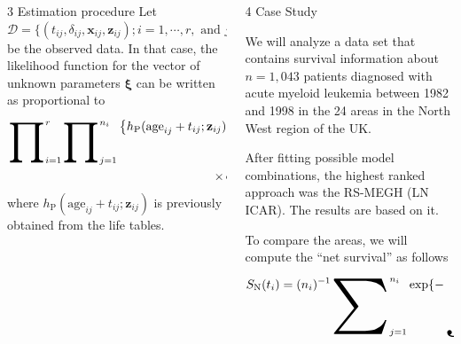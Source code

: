 \documentclass[12pt]{beamer}
\begin{document}
\begin{frame}[t]
\begin{columns}[t]
\begin{column}{0.30\textwidth}
\begin{block}{\Large 3 Estimation procedure}
			Let $\mathcal{D} = \{(t_{ij}, \delta_{ij}, \mathbf{x}_{ij}, \mathbf{z}_{ij}); i = 1, \cdots, r, \text{ and } j = 1, \cdots, n_i\}$ be the observed data. In that case, the likelihood function for the vector of unknown parameters $\boldsymbol{\xi}$ can be written as proportional to
			\begin{align*}
				\displaystyle\raisebox{-18pt}{\scalebox{3.2}{\ensuremath{\prod}}}_{i = 1}^{r}\displaystyle\raisebox{-18pt}{\scalebox{3.2}{\ensuremath{\prod}}}_{j = 1}^{n_i} \left\{h_{\text{P}}(\text{age}_{ij} + t_{ij}; \mathbf{z}_{ij}) + h_{\text{E}}(t_{ij}; \mathbf{x}_{ij}, \tilde{u}_i, u_i)\right\}^{\delta_{ij}} \times \\ 
				\times \exp\{-H_{\text{E}}(t_{ij}; \textbf{x}_{ij}, \tilde{u}_i, u_i)\},
			\end{align*}
			where $h_{\text{P}}(\text{age}_{ij} + t_{ij}; \mathbf{z}_{ij})$ is previously obtained from the life tables. 
				
				\vspace{18pt}
				
			\end{block}
			
			\vspace{18pt}
			
			\end{column}
		
			\begin{column}{0.30\textwidth} \justifying %
		
			\begin{block}{\Large 4 Case Study} \justifying \vspace{12pt}				
				
		We will analyze a data set that contains survival information about $n = 1,043$ patients diagnosed with acute myeloid leukemia between 1982 and 1998 in the 24 areas in the North West region of the UK.	
		
		\vspace{12pt}
		
		After fitting possible model combinations, the highest ranked approach was the RS-MEGH (LN ICAR). The results are based on it.
		
		\vspace{12pt}
		
		To compare the areas, we will compute the ``net survival'' as follows
		\begin{align*} 
			S_{\text{N}}(t_{i}) = (n_i)^{-1}\displaystyle\raisebox{-26pt}{\scalebox{4.5}{\ensuremath{\sum}}}_{j=1}^{n_i}\exp\{-\displaystyle\raisebox{-26pt}{\scalebox{4.5}{\ensuremath{\int}}}_{0}^{t_{ij}} h_{\text{E}}(\ell; \textbf{x}_{ij}, \tilde{u}_i, u_i) d\ell\}, ~\forall i.
		\end{align*}
	

\end{block}
\end{column}
\end{columns}
\end{frame}
\end{document}
